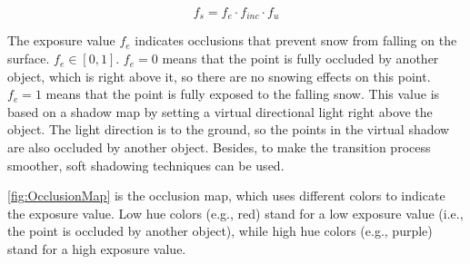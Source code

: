 \documentclass{article}
\begin{document}
\[
  f_{s} = f_{e} \cdot f_{inc} \cdot f_{u}
\]

The exposure value \( f_{e} \) indicates occlusions that prevent snow from falling on the surface. %
\( f_{e} \in [0, 1] \). \( f_{e}=0 \) means that the point is fully occluded by another object, which is right 
above it, so there are no snowing effects on this point. \( f_{e}=1 \) means that the point is fully exposed to the 
falling snow. This value is based on a shadow map by setting a virtual directional light right above the object. 
The light direction is to the ground, so the points in the virtual shadow are also occluded by another object. 
Besides, to make the transition process smoother, soft shadowing techniques can be used. 

\ref{fig:OcclusionMap} is the occlusion map, which uses different colors to indicate the exposure value. Low hue 
colors (e.g., red) stand for a low exposure value (i.e., the point is occluded by another object), while high hue
colors (e.g., purple) stand for a high exposure value.
\end{document}

